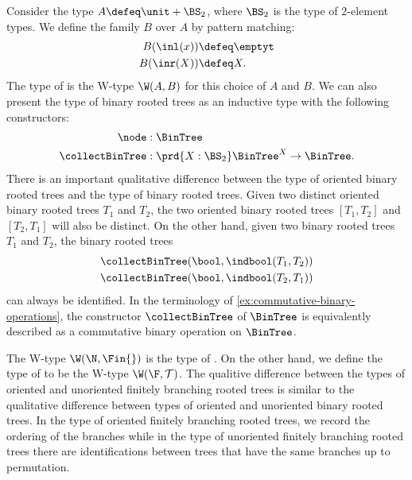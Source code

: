 \begin{eg}\label{eg:binary-tree-W}
  Consider the type $A\defeq \unit+\BS_2$, where $\BS_2$ is the type of $2$-element types. We define the family $B$ over $A$ by pattern matching:
  \begin{align*}
    B(\inl(x)) & \defeq \emptyt \\
    B(\inr(X)) & \defeq X.
  \end{align*}
  The type of  is the W-type $\W(A,B)$ for this choice of $A$ and $B$. We can also present the type of binary rooted trees as an inductive type with the following constructors:
  \begin{align*}
    \node & : \BinTree \\
    \collectBinTree & : \prd{X:\BS_2} \BinTree^X\to \BinTree.
  \end{align*}
  There is an important qualitative difference between the type of oriented binary rooted trees and the type of binary rooted trees. Given two distinct oriented binary rooted trees $T_1$ and $T_2$, the two oriented binary rooted trees $[T_1,T_2]$ and $[T_2,T_1]$ will also be distinct. On the other hand, given two binary rooted trees $T_1$ and $T_2$, the binary rooted trees
  \begin{align*}
    & \collectBinTree (\bool,\indbool(T_1,T_2)) \\
    & \collectBinTree(\bool,\indbool(T_2,T_1))
  \end{align*}
  can always be identified. In the terminology of \cref{ex:commutative-binary-operations}, the constructor $\collectBinTree$ of $\BinTree$ is equivalently described as a commutative binary operation on $\BinTree$.
\end{eg}

\begin{eg}\label{eg:finitely-branching-tree-W}
  The W-type $\W(\N,\Fin{})$ is the type of . On the other hand, we define the type of  to be the W-type $\W(\F,\mathcal{T})$. The qualitive difference between the types of oriented and unoriented finitely branching rooted trees is similar to the qualitative difference between types of oriented and unoriented binary rooted trees. In the type of oriented finitely branching rooted trees, we record the ordering of the branches while in the type of unoriented finitely branching rooted trees there are identifications between trees that have the same branches up to permutation.
\end{eg}

